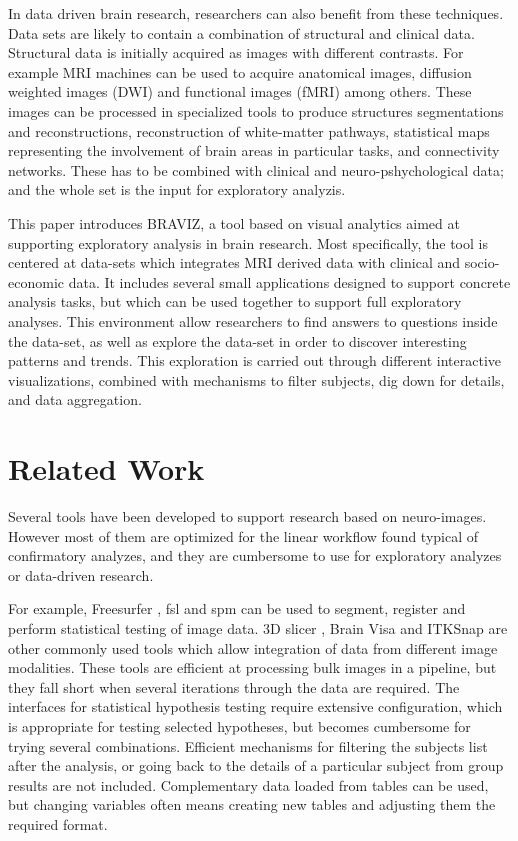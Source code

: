 \documentclass[utf8,paper]{frontiersSCNS} %
\begin{document}
In data driven brain research, researchers can also benefit from these techniques. Data sets are likely to contain a combination of structural and clinical data. Structural data is initially acquired as images with different contrasts. For example MRI machines can be used to acquire anatomical images, diffusion weighted images (DWI) and functional images (fMRI) among others. These images can be processed in specialized tools to produce structures segmentations and reconstructions, reconstruction of white-matter pathways, statistical maps representing the involvement of brain areas in particular tasks, and connectivity networks. These has to be combined with clinical and neuro-pshychological data; and the whole set is the input for exploratory analyzis.


This paper introduces BRAVIZ, a tool based on visual analytics aimed at supporting exploratory analysis in brain research. Most specifically, the tool is centered at data-sets which integrates MRI derived data with clinical and socio-economic data. It includes several small applications designed to support concrete analysis tasks, but which can be used together to support full exploratory analyses. This environment allow researchers to find answers to questions inside the data-set, as well as explore the data-set in order to discover interesting patterns and trends. This exploration is carried out through different interactive visualizations, combined with mechanisms to filter subjects, dig down for details, and data aggregation.


\section{Related Work}

Several tools have been developed to support research based on neuro-images. However most of them are optimized for the linear workflow found typical of confirmatory analyzes, and they are cumbersome to use for exploratory analyzes or data-driven research.

For example, Freesurfer  \citep{fischl_freesurfer_2012}, fsl\citep{jenkinson_fsl_2012} and spm \citep{friston_statistical_2006} can be used to segment, register and perform statistical testing of image data. 3D slicer \citep{fedorov_3d_2012}, Brain Visa \citep{cointepas_brainvisa:_2001} and ITKSnap \citep{yushkevich_user-guided_2006} are other commonly used tools which allow integration of data from different image modalities. These tools are efficient at processing bulk images in a pipeline, but they fall short when several iterations through the data are required. The interfaces for statistical hypothesis testing require extensive configuration, which is appropriate for testing selected hypotheses, but becomes cumbersome for trying several combinations. Efficient mechanisms for filtering the subjects list after the analysis, or going back to the details of a particular subject from group results are not included. Complementary data loaded from tables can be used, but changing variables often means creating new tables and adjusting them the required format.
\end{document}
